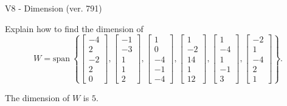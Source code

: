 \begin{exercise}
  \begin{exerciseTitle}V8 - Dimension (ver. 791)\end{exerciseTitle}
  \begin{exerciseStatement}
    Explain how to find the dimension of 
\[W=\mathrm{span}\ \left\{\left[\begin{array}{r}
-4 \\
2 \\
-2 \\
2 \\
0
\end{array}\right] , \left[\begin{array}{r}
-1 \\
-3 \\
1 \\
1 \\
2
\end{array}\right] , \left[\begin{array}{r}
1 \\
0 \\
-4 \\
-1 \\
-4
\end{array}\right] , \left[\begin{array}{r}
1 \\
-2 \\
14 \\
1 \\
12
\end{array}\right] , \left[\begin{array}{r}
1 \\
-4 \\
1 \\
-1 \\
3
\end{array}\right] , \left[\begin{array}{r}
-2 \\
1 \\
-4 \\
2 \\
1
\end{array}\right]\right\}.\]



  \end{exerciseStatement}
  \begin{exerciseAnswer}
   The dimension of \(W\) is  \(5\).
  


  \end{exerciseAnswer}
\end{exercise}